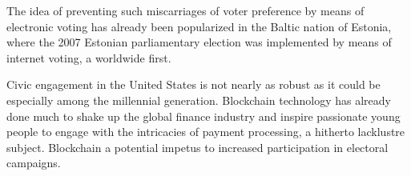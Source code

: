 The idea of preventing such miscarriages of voter preference by means of electronic voting has already been popularized in the Baltic nation of Estonia, where the 2007 Estonian parliamentary election was implemented by means of internet voting, a worldwide first.

Civic engagement in the United States is not nearly as robust as it could be especially among the millennial generation. 
Blockchain technology has already done much to shake up the global finance industry and inspire passionate young people to engage with the intricacies of payment processing, a hitherto lacklustre subject. 
Blockchain a potential impetus to increased participation in electoral campaigns. 